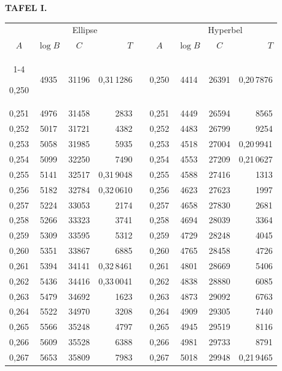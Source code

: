 \endgroup
\clearpage
{}
\begingroup
\centering
\fontsize{9}{9}\selectfont
\setlength{\tabcolsep}{6pt}
\renewcommand{\arraystretch}{1}
\setlength{\parskip}{0pt}
\textbf{TAFEL I.}
\par\vspace{7pt}
\begin{tabular}{|c|c|c|r|@{}p{9pt}@{}|c|c|c|r|}
\hline
\rule{0pt}{8.5pt} & \multicolumn{3}{c|}{Ellipse} & & & \multicolumn{3}{c|}{Hyperbel} \\
\(A\) & \(\log B\) & \(C\) & \(T\) & & \(A\) & \(\log B\) & \(C\) & \(T\) \\
\cline{1-4}\cline{6-9}
\rule{0pt}{8.5pt}0,250 & 4935 & 31196 & 0,31\,1286 &  & 0,250 & 4414 & 26391 & 0,20\,7876 \\
0,251 & 4976 & 31458 & 2833 &  & 0,251 & 4449 & 26594 & 8565 \\
0,252 & 5017 & 31721 & 4382 &  & 0,252 & 4483 & 26799 & 9254 \\
0,253 & 5058 & 31985 & 5935 &  & 0,253 & 4518 & 27004 & 0,20\,9941 \\
0,254 & 5099 & 32250 & 7490 &  & 0,254 & 4553 & 27209 & 0,21\,0627 \\
0,255 & 5141 & 32517 & 0,31\,9048 &  & 0,255 & 4588 & 27416 & 1313 \\[3pt]
0,256 & 5182 & 32784 & 0,32\,0610 &  & 0,256 & 4623 & 27623 & 1997 \\
0,257 & 5224 & 33053 & 2174 &  & 0,257 & 4658 & 27830 & 2681 \\
0,258 & 5266 & 33323 & 3741 &  & 0,258 & 4694 & 28039 & 3364 \\
0,259 & 5309 & 33595 & 5312 &  & 0,259 & 4729 & 28248 & 4045 \\
0,260 & 5351 & 33867 & 6885 &  & 0,260 & 4765 & 28458 & 4726 \\[3pt]
0,261 & 5394 & 34141 & 0,32\,8461 &  & 0,261 & 4801 & 28669 & 5406 \\
0,262 & 5436 & 34416 & 0,33\,0041 &  & 0,262 & 4838 & 28880 & 6085 \\
0,263 & 5479 & 34692 & 1623 &  & 0,263 & 4873 & 29092 & 6763 \\
0,264 & 5522 & 34970 & 3208 &  & 0,264 & 4909 & 29305 & 7440 \\
0,265 & 5566 & 35248 & 4797 &  & 0,265 & 4945 & 29519 & 8116 \\[3pt]
0,266 & 5609 & 35528 & 6388 &  & 0,266 & 4981 & 29733 & 8791 \\
0,267 & 5653 & 35809 & 7983 &  & 0,267 & 5018 & 29948 & 0,21\,9465 \\

\end{tabular}
